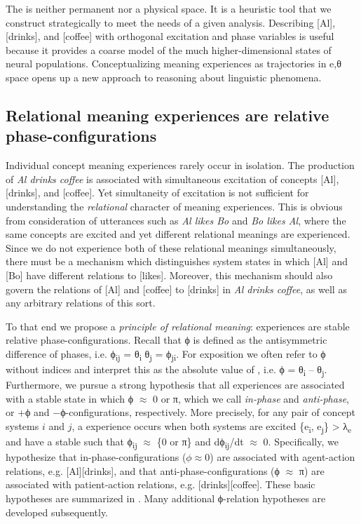   The  is neither permanent nor a physical space. It is a heuristic tool that we construct strategically to meet the needs of a given analysis. Describing [Al], [drinks], and [coffee] with orthogonal excitation and phase variables is useful because it provides a coarse model of the much higher-di\-men\-sional states of neural populations. Conceptualizing meaning experiences as trajectories in e,θ space opens up a new approach to reasoning about linguistic phenomena.

\subsection{Relational meaning experiences are relative phase-con\-fi\-gu\-ra\-tions}

Individual concept meaning experiences rarely occur in isolation. The production of \textit{Al drinks coffee} is associated with simultaneous excitation of concepts [Al], [drinks], and [coffee]. Yet simultaneity of excitation is not sufficient for understanding the \textit{relational} character of meaning experiences. This is obvious from consideration of utterances such as \textit{Al likes Bo} and \textit{Bo likes Al}, where the same concepts are excited and yet different relational meanings are experienced. Since we do not experience both of these relational meanings simultaneously, there must be a mechanism which distinguishes system states in which [Al] and [Bo] have different relations to [likes]. Moreover, this mechanism should also govern the relations of [Al] and [coffee] to [drinks] in \textit{Al drinks coffee}, as well as any arbitrary relations of this sort. 

  To that end we propose a \textit{principle of relational meaning}:  experiences are stable relative phase-configurations. Recall that  ϕ is defined as the antisymmetric difference of phases, i.e. ϕ\textsubscript{ij} = θ\textsubscript{i} \textminus{} θ\textsubscript{j} = \textminus{}ϕ\textsubscript{ji}. For exposition we often refer to ϕ without indices and interpret this as the absolute value of , i.e. {\textbar}ϕ{\textbar} = {\textbar}θ\textsubscript{i} – θ\textsubscript{j}{\textbar}. Furthermore, we pursue a strong hypothesis that all  experiences are associated with a stable state in which ϕ ${\approx}$ 0 or π, which we call \textit{in-phase} and \textit{anti-phase}, or +ϕ and −ϕ-configurations, respectively. More precisely, for any pair of concept systems $i$ and $j$, a  experience occurs when both systems are excited \{e\textsubscript{i}, e\textsubscript{j}\} > λ\textsubscript{e} and have a stable  such that {\textbar}ϕ\textsubscript{ij}{\textbar} ${\approx}$ \{0 or π\} and dϕ\textsubscript{ij}/dt ${\approx}$ 0. Specifically, we hypothesize that in-phase-configurations ($ϕ \approx 0$) are associated with agent-action relations, e.g. [Al][drinks], and that anti-phase-configurations (ϕ ${\approx}$ π) are associated with patient-action relations, e.g. [drinks][coffee]. These basic hypotheses are summarized in {}. Many additional ϕ-relation hypotheses are developed subsequently.

